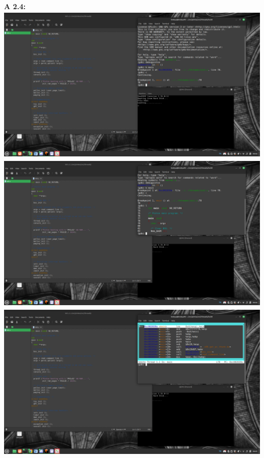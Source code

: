 \documentclass[a4paper,11pt]{paper}
\begin{document}
\textbf{A 2.4:}\\
\includegraphics[height=3in]{mainss.png}\\
\includegraphics[height=3in]{mainlss.png}\\
\includegraphics[height=3in]{mainasm.png}
\end{document}
